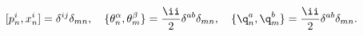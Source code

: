 \begin{equation}\label{PB}
  [p^i_n,x^i_n]=\delta^{ij}\delta_{mn},\quad
  \{\theta^\alpha_n,\theta^\beta_m\}=\frac{\ii}{2}\delta^{ab}\delta_{mn},\quad
  \{\q^a_n,\q^b_m\}=\frac{\ii}{2}\delta^{ab}\delta_{mn}.
\end{equation}


